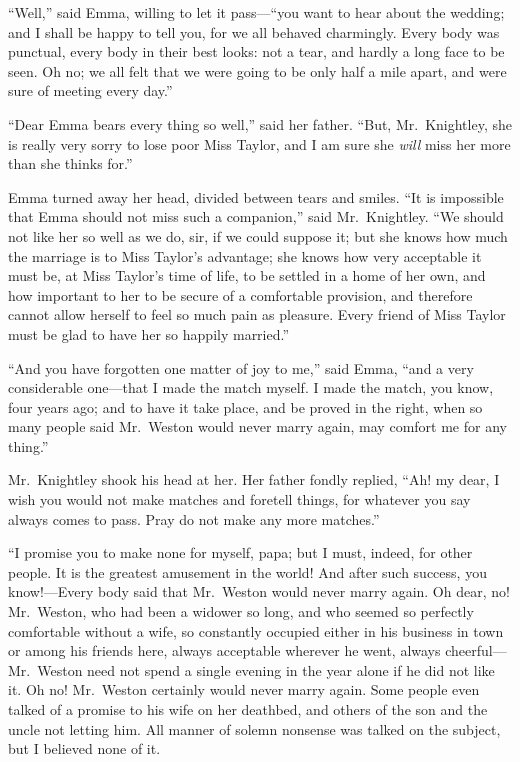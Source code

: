 ``Well,'' said Emma, willing to let it pass---``you want to hear
about the wedding; and I shall be happy to tell you, for we all
behaved charmingly.  Every body was punctual, every body in their
best looks: not a tear, and hardly a long face to be seen.  Oh no;
we all felt that we were going to be only half a mile apart,
and were sure of meeting every day.''

``Dear Emma bears every thing so well,'' said her father.
``But, Mr.\ Knightley, she is really very sorry to lose poor Miss Taylor,
and I am sure she \emph{will} miss her more than she thinks for.''

Emma turned away her head, divided between tears and smiles.
``It is impossible that Emma should not miss such a companion,''
said Mr.\ Knightley.  ``We should not like her so well as we do, sir,
if we could suppose it; but she knows how much the marriage is to
Miss Taylor's advantage; she knows how very acceptable it must be,
at Miss Taylor's time of life, to be settled in a home of her own,
and how important to her to be secure of a comfortable provision,
and therefore cannot allow herself to feel so much pain as pleasure.
Every friend of Miss Taylor must be glad to have her so happily
married.''

``And you have forgotten one matter of joy to me,'' said Emma,
``and a very considerable one---that I made the match myself.
I made the match, you know, four years ago; and to have it take place,
and be proved in the right, when so many people said Mr.\ Weston would
never marry again, may comfort me for any thing.''

Mr.\ Knightley shook his head at her.  Her father fondly replied,
``Ah! my dear, I wish you would not make matches and foretell things,
for whatever you say always comes to pass.  Pray do not make any
more matches.''

``I promise you to make none for myself, papa; but I must, indeed,
for other people.  It is the greatest amusement in the world! And
after such success, you know!---Every body said that Mr.\ Weston would
never marry again.  Oh dear, no! Mr.\ Weston, who had been a widower
so long, and who seemed so perfectly comfortable without a wife,
so constantly occupied either in his business in town or among his
friends here, always acceptable wherever he went, always cheerful---%
Mr.\ Weston need not spend a single evening in the year alone if he did
not like it.  Oh no! Mr.\ Weston certainly would never marry again.
Some people even talked of a promise to his wife on her deathbed,
and others of the son and the uncle not letting him.  All manner
of solemn nonsense was talked on the subject, but I believed none
of it.

